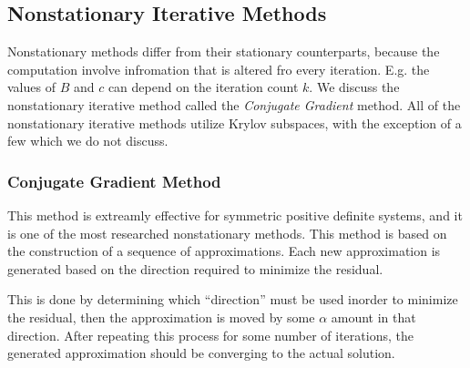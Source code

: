 \documentclass[../fem.tex]{subfiles}
\begin{document}
\subsection{Nonstationary Iterative Methods}%
\label{sub:nonstationary_iterative_methods}

Nonstationary methods differ from their stationary counterparts, because the
computation involve infromation that is altered fro every iteration. E.g. the
values of $B$ and $c$ can depend on the iteration count $k$. We discuss the
nonstationary iterative method called the  \textit{Conjugate Gradient} method.
All of the nonstationary iterative methods utilize Krylov subspaces, with the
exception of a few which we do not discuss.

\subsubsection{Conjugate Gradient Method}%
\label{ssub:conjugate_gradient_method}

This method is extreamly effective for symmetric positive definite systems, and
it is one of the most researched nonstationary methods. This method is based on
the construction of a sequence of approximations. Each new approximation is
generated based on the direction required to minimize the residual.


\begin{Figure}
   \begin{center}
     
   \end{center}
   \label{fig:cg_time}
\end{Figure}

This is done by determining which ``direction'' must be used inorder to
minimize the residual, then the approximation is moved by some $\alpha$ amount
in that direction. After repeating this process for some number of iterations,
the generated approximation should be converging to the actual solution.

\begin{Figure}
   \begin{center}
     
   \end{center}
   \label{fig:cg_err}
\end{Figure}
\end{document}
